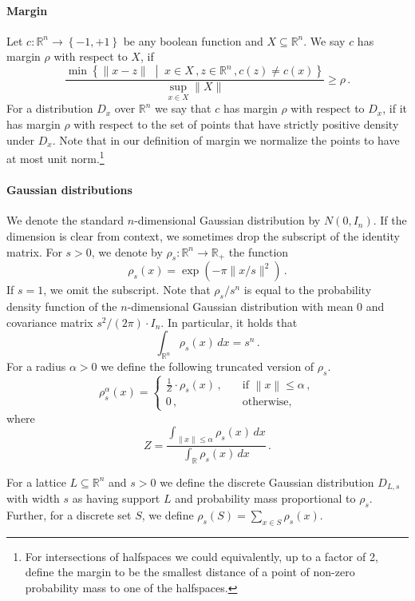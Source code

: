 \documentclass{theoretics}
\newcommand{\Paren}[1]{\left(#1\right)}
\newcommand{\Set}[1]{\left\{#1\right\}}
\newcommand{\norm}[1]{\lVert#1\rVert}
\newcommand{\Norm}[1]{\left\lVert#1\right\rVert}
\newcommand{\snorm}[1]{\norm{#1}^2}
\newcommand{\suchthat}{\;\middle\vert\;}
\newcommand{\R}{\mathbb R}
\renewcommand{\leq}{\leqslant}
\renewcommand{\geq}{\geqslant}
\newcommand{\sse}{\subseteq}
\begin{document}
\paragraph{Margin}
Let $c \colon \R^n \rightarrow \Set{-1,+1}$ be any boolean function and $X \sse \R^n$.
We say $c$ has margin $\rho$ with respect to $X$, if
\[
    \frac{\min \Set{\norm{x - z} \suchthat x \in X \,, z \in \R^n \,, c(z) \neq c(x) } } {\sup_{x \in X} \norm{X}} \geq \rho \,.
\]
For a distribution $D_x$ over $\R^n$ we say that $c$ has margin $\rho$ with respect to $D_x$, if it has margin $\rho$ with respect to the set of points that have strictly positive density under $D_x$.
Note that in our definition of margin we normalize the points to have at most unit norm.\footnote{For intersections of halfspaces we could equivalently, up to a factor of 2, define the margin to be the smallest distance of a point of non-zero probability mass to one of the halfspaces.}




\paragraph{Gaussian distributions}
We denote the standard $n$-dimensional Gaussian distribution by $N(0,I_n)$.
If the dimension is clear from context, we sometimes drop the subscript of the identity matrix.
For $s > 0$, we denote by $\rho_s \colon \R^n \rightarrow \R_+$ the function \[\rho_s(x) = \exp(-\pi \snorm{x /s})\,.\]
If $s = 1$, we omit the subscript.
Note that $\rho_s/s^n$ is equal to the probability density function of the $n$-dimensional Gaussian distribution with mean 0 and covariance matrix $s^2/(2\pi) \cdot I_n$.
In particular, it holds that \[\int_{\R^n} \rho_s(x) \,dx = s^n \,.\]
For a radius $\alpha > 0$ we define the following truncated version of $\rho_s$.
\[\rho_s^{\alpha}(x) = \begin{cases}
    \tfrac 1 Z \cdot \rho_s(x) \,, &\quad \text{if } \Norm{x} \leq \alpha \,, \\
    0 \,, &\quad \text{otherwise,}
\end{cases}\]
where \[Z = \frac{\int_{\Norm{x} \leq \alpha} \rho_s(x) \, d x}{\int_{\R} \rho_s(x) \, d x}\,.\]

For a lattice $L \sse \R^n$ and $s > 0$ we define the discrete Gaussian distribution $D_{L, s}$ with width $s$ as having support $L$ and probability mass proportional to $\rho_s$.
Further, for a discrete set $S$, we define $\rho_s\Paren{S} = \sum_{x \in S} \rho_s\Paren{x}$.
\end{document}
